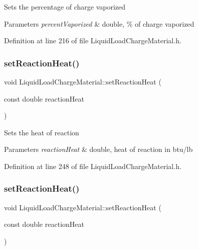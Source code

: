 Sets the percentage of charge vaporized 
\begin{DoxyParams}{Parameters}
{\em percent\+Vaporized} & double, \% of charge vaporized \\
\hline
\end{DoxyParams}


Definition at line 216 of file Liquid\+Load\+Charge\+Material.\+h.

\mbox{\label{class_liquid_load_charge_material_a793c7ebc2643b2af0eaf21b9cb788775}} 
\subsubsection{\texorpdfstring{set\+Reaction\+Heat()}{setReactionHeat()}\hspace{0.1cm}{\footnotesize\ttfamily [1/3]}}
{\footnotesize\ttfamily void Liquid\+Load\+Charge\+Material\+::set\+Reaction\+Heat (\begin{DoxyParamCaption}\item[{const double}]{reaction\+Heat }\end{DoxyParamCaption})\hspace{0.3cm}{\ttfamily [inline]}}

Sets the heat of reaction 
\begin{DoxyParams}{Parameters}
{\em reaction\+Heat} & double, heat of reaction in btu/lb \\
\hline
\end{DoxyParams}


Definition at line 248 of file Liquid\+Load\+Charge\+Material.\+h.

\mbox{\label{class_liquid_load_charge_material_a793c7ebc2643b2af0eaf21b9cb788775}} 
\subsubsection{\texorpdfstring{set\+Reaction\+Heat()}{setReactionHeat()}\hspace{0.1cm}{\footnotesize\ttfamily [2/3]}}
{\footnotesize\ttfamily void Liquid\+Load\+Charge\+Material\+::set\+Reaction\+Heat (\begin{DoxyParamCaption}\item[{const double}]{reaction\+Heat }\end{DoxyParamCaption})\hspace{0.3cm}{\ttfamily [inline]}}

